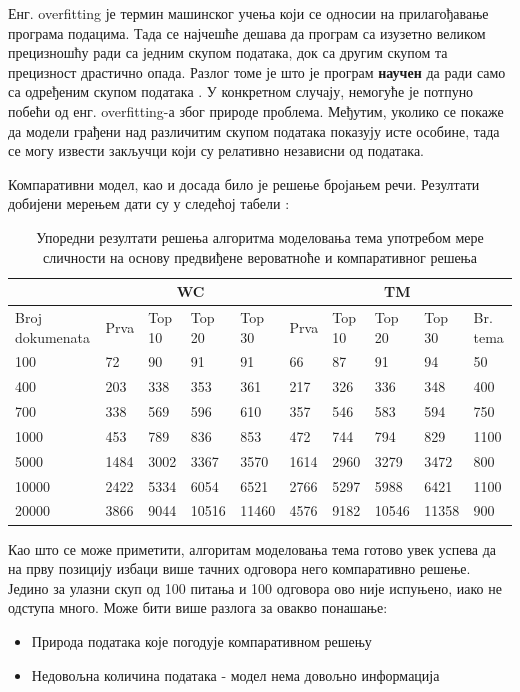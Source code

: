 Енг. overfitting је термин машинског учења који се односии на прилагођавање програма подацима. Тада се најчешће дешава да програм  са изузетно великом прецизношћу  ради са једним скупом података, док са другим скупом та прецизност драстично опада. Разлог томе је што је програм \textbf{научен} да ради само са одређеним скупом података .
У конкретном случају, немогуће је потпуно побећи од енг. overfitting-а због природе проблема. Међутим, уколико се покаже да модели грађени над различитим скупом података показују исте особине, тада се могу извести закључци који су релативно независни од података. 
 

Компаративни модел, као и досада било је решење бројањем речи. Резултати добијени мерењем дати су у следећој табели :
\begin{table}[H]
\centering
\caption{Упоредни резултати решења алгоритма моделовања тема употребом мере сличности на основу предвиђене вероватноће и компаративног решења}
\begin{tabular}{ | l | l | l | l | l || l | l | l | l | l | }
\hline
	 & \multicolumn{4}{|c||}{WC}  & \multicolumn{5}{|c|}{TM}  \\ \hline
	Broj dokumenata & Prva & Top 10 & Top 20 & Top 30 & Prva & Top 10 & Top 20 & Top 30 &  Br. tema \\ \hline
	100 & 72 & 90 & 91 & 91 & 66 & 87 & 91 & 94 & 50 \\ \hline
	400 & 203 & 338 & 353 & 361 & 217 & 326 & 336 & 348 & 400 \\ \hline
	700 & 338 & 569 & 596 & 610 & 357 & 546 & 583 & 594 & 750 \\ \hline
	1000 & 453 & 789 & 836 & 853 & 472 & 744 & 794 & 829 & 1100 \\ \hline
	5000 & 1484 & 3002 & 3367 & 3570 & 1614 & 2960 & 3279 & 3472 & 800 \\ \hline
	10000 & 2422 & 5334 & 6054 & 6521 & 2766 & 5297 & 5988 & 6421 & 1100 \\ \hline
	20000 & 3866 & 9044 & 10516 & 11460 & 4576 & 9182 & 10546 & 11358 & 900 \\ \hline
\end{tabular}
\end{table}

Као што се може приметити, алгоритам моделовања тема готово увек успева да на прву позицију избаци више тачних одговора него компаративно решење. Једино за  улазни скуп од 100 питања и 100 одговора ово није испуњено, иако не одступа много. Може бити више разлога за овакво понашање:
\begin{itemize}
\item Природа података које погодује компаративном решењу
\item Недовољна количина података - модел  нема довољно информација
\end{itemize}

